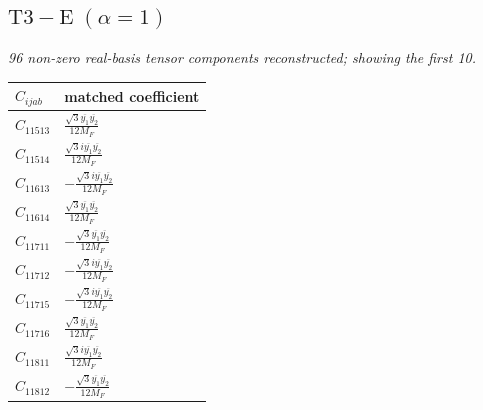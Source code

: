 \documentclass[9pt]{article}
\begin{document}
\subsection*{$ \mathrm{T3-E}\;(\alpha=1) $}
\textit{96 non-zero real-basis tensor components reconstructed; showing the first 10.}
\begin{longtable}{@{}ll@{}}
\toprule
$C_{ijab}$ & matched coefficient \\
\midrule
$C_{11513}$ & $ \frac{\sqrt{3} \overline{y_{1}} \overline{y_{2}}}{12 M_F} $ \\
$C_{11514}$ & $ \frac{\sqrt{3} i \overline{y_{1}} \overline{y_{2}}}{12 M_F} $ \\
$C_{11613}$ & $ - \frac{\sqrt{3} i \overline{y_{1}} \overline{y_{2}}}{12 M_F} $ \\
$C_{11614}$ & $ \frac{\sqrt{3} \overline{y_{1}} \overline{y_{2}}}{12 M_F} $ \\
$C_{11711}$ & $ - \frac{\sqrt{3} \overline{y_{1}} \overline{y_{2}}}{12 M_F} $ \\
$C_{11712}$ & $ - \frac{\sqrt{3} i \overline{y_{1}} \overline{y_{2}}}{12 M_F} $ \\
$C_{11715}$ & $ - \frac{\sqrt{3} i \overline{y_{1}} \overline{y_{2}}}{12 M_F} $ \\
$C_{11716}$ & $ \frac{\sqrt{3} \overline{y_{1}} \overline{y_{2}}}{12 M_F} $ \\
$C_{11811}$ & $ \frac{\sqrt{3} i \overline{y_{1}} \overline{y_{2}}}{12 M_F} $ \\
$C_{11812}$ & $ - \frac{\sqrt{3} \overline{y_{1}} \overline{y_{2}}}{12 M_F} $ \\
\bottomrule
\end{longtable}
\end{document}
